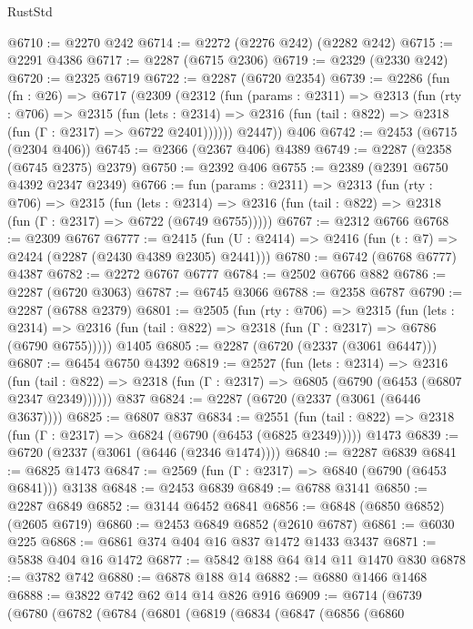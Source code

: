 \begin{lexlean}{RustStd}
\begin{coremodule}
@6710 := @2270 @242
@6714 := @2272 (@2276 @242) (@2282 @242)
@6715 := @2291 @4386
@6717 := @2287 (@6715 @2306)
@6719 := @2329 (@2330 @242)
@6720 := @2325 @6719
@6722 := @2287 (@6720 @2354)
@6739 := @2286
    (fun (fn : @26) =>
    @6717
      (@2309
        (@2312
          (fun (params : @2311) =>
          @2313
            (fun (rty : @706) =>
            @2315
              (fun (lets : @2314) =>
              @2316 (fun (tail : @822) => @2318 (fun (Γ : @2317) => @6722 @2401))))))
        @2447))
    @406
@6742 := @2453 (@6715 (@2304 @406))
@6745 := @2366 (@2367 @406) @4389
@6749 := @2287 (@2358 (@6745 @2375) @2379)
@6750 := @2392 @406
@6755 := @2389 (@2391 @6750 @4392 @2347 @2349)
@6766 := fun (params : @2311) =>
  @2313
    (fun (rty : @706) =>
    @2315
      (fun (lets : @2314) =>
      @2316 (fun (tail : @822) => @2318 (fun (Γ : @2317) => @6722 (@6749 @6755)))))
@6767 := @2312 @6766
@6768 := @2309 @6767
@6777 := @2415 (fun (U : @2414) => @2416 (fun (t : @7) => @2424 (@2287 (@2430 @4389 @2305) @2441)))
@6780 := @6742 (@6768 @6777) @4387
@6782 := @2272 @6767 @6777
@6784 := @2502 @6766 @882
@6786 := @2287 (@6720 @3063)
@6787 := @6745 @3066
@6788 := @2358 @6787
@6790 := @2287 (@6788 @2379)
@6801 := @2505
    (fun (rty : @706) =>
    @2315
      (fun (lets : @2314) =>
      @2316 (fun (tail : @822) => @2318 (fun (Γ : @2317) => @6786 (@6790 @6755)))))
    @1405
@6805 := @2287 (@6720 (@2337 (@3061 @6447)))
@6807 := @6454 @6750 @4392
@6819 := @2527
    (fun (lets : @2314) =>
    @2316
      (fun (tail : @822) => @2318 (fun (Γ : @2317) => @6805 (@6790 (@6453 (@6807 @2347 @2349))))))
    @837
@6824 := @2287 (@6720 (@2337 (@3061 (@6446 @3637))))
@6825 := @6807 @837
@6834 := @2551
    (fun (tail : @822) => @2318 (fun (Γ : @2317) => @6824 (@6790 (@6453 (@6825 @2349)))))
    @1473
@6839 := @6720 (@2337 (@3061 (@6446 (@2346 @1474))))
@6840 := @2287 @6839
@6841 := @6825 @1473
@6847 := @2569 (fun (Γ : @2317) => @6840 (@6790 (@6453 @6841))) @3138
@6848 := @2453 @6839
@6849 := @6788 @3141
@6850 := @2287 @6849
@6852 := @3144 @6452 @6841
@6856 := @6848 (@6850 @6852) (@2605 @6719)
@6860 := @2453 @6849 @6852 (@2610 @6787)
@6861 := @6030 @225
@6868 := @6861 @374 @404 @16 @837 @1472 @1433 @3437
@6871 := @5838 @404 @16 @1472
@6877 := @5842 @188 @64 @14 @11 @1470 @830
@6878 := @3782 @742
@6880 := @6878 @188 @14
@6882 := @6880 @1466 @1468
@6888 := @3822 @742 @62 @14 @14 @826 @916
@6909 := @6714
    (@6739
      (@6780
        (@6782
          (@6784
            (@6801
              (@6819
                (@6834
                  (@6847
                    (@6856
                      (@6860

\end{coremodule}
\end{lexlean}
